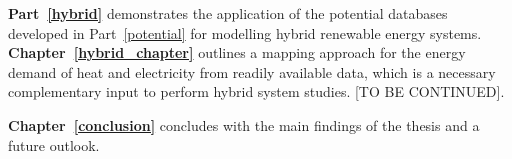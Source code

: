 \textbf{Part~\ref{hybrid}} demonstrates the application of the potential databases developed in Part~\ref{potential} for modelling hybrid renewable energy systems. \textbf{Chapter~\ref{hybrid_chapter}} outlines a mapping approach for the energy demand of heat and electricity from readily available data, which is a necessary complementary input to perform hybrid system studies. [TO BE CONTINUED].

\textbf{Chapter~\ref{conclusion}} concludes with the main findings of the thesis and a future outlook.



